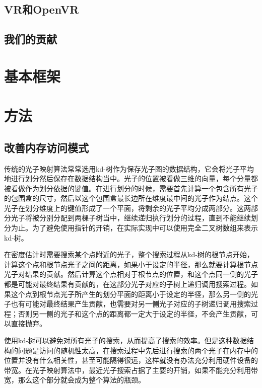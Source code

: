 \documentclass[UTF8]{ctexart}
\begin{document}
    \subsection{VR和OpenVR}
    
    \subsection{我们的贡献}

\section{基本框架}

\section{方法}

    \subsection{改善内存访问模式}
    传统的光子映射算法\cite{jensen2000practical}常常选用kd-树\cite{1975Multidimensional}作为保存光子图的数据结构，它会将光子平均地进行划分然后保存在数据结构当中。光子的位置被看做三维的向量，每个分量都被看做作为划分依据的键值。在进行划分的时候，需要首先计算一个包含所有光子的包围盒的尺寸，然后以这个包围盒最长边所在维度最中间的光子作为结点。这个光子在划分维度上的键值形成了一个平面，将剩余的光子平均分成两部分。这两部分光子将被分别分配到两棵子树当中，继续递归执行划分的过程，直到不能继续划分为止。为了避免使用指针的开销，在实际实现中可以使用完全二叉树数组来表示kd-树。
    
    在密度估计时需要搜索某个点附近的光子，整个搜索过程从kd-树的根节点开始，计算这个点和根节点光子之间的距离，如果小于设定的半径，那么就要计算根节点光子对结果的贡献。然后计算这个点相对于根节点的位置，和这个点同一侧的光子都是可能对最终结果有贡献的，在这部分光子对应的子树上递归调用搜索过程。如果这个点到根节点光子所产生的划分平面的距离小于设定的半径，那么另一侧的光子也有可能对最终结果产生贡献，也需要对另一侧光子对应的子树递归调用搜索过程；否则另一侧的光子和这个点的距离都一定大于设定的半径，不会产生贡献，可以直接抛弃。
    
    使用kd-树可以避免对所有光子的搜索，从而提高了搜索的效率。但是这种数据结构的问题是访问的随机性太高，在搜索过程中先后进行搜索的两个光子在内存中的位置并没有什么相关性，甚至可能隔得很远，这样就没有办法充分利用硬件设备的带宽。在光子映射算法中，最近光子搜索占据了主要的开销\cite{gupte2011real}，如果不能充分利用带宽，那么这个部分就会成为整个算法的瓶颈。
    
\end{document}
